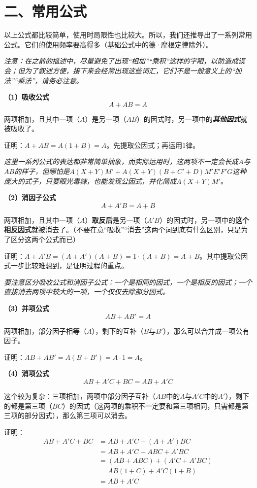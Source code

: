 \documentclass[UTF8]{ctexart}
\begin{document}
\section*{二、常用公式}

以上公式都比较简单，使用时局限性也比较大。所以，我们还推导出了一系列常用公式。它们的使用频率要高得多（基础公式中的德·摩根定律除外）。

\textit{注意：在之前的描述中，尽量避免了出现“相加”“乘积”这样的字眼，以防造成误会；但为了叙述方便，接下来会经常出现这些词汇，它们不是一般意义上的“加法”“乘法”，请务必注意。}

\textbf{（1）吸收公式}
\[A+AB=A\]

两项相加，且其中一项（$A$）是另一项（$AB$）的因式时，另一项中的\textbf{\textit{其他因式}}就被吸收了。

证明：$A+AB=A(1+B)=A$。先提取公因式；再运用1律。

\textit{这里一系列公式的表达都非常简单抽象，而实际运用时，这两项不一定会长成$A$与$AB$的样子，但哪怕是$A(X+Y)M'+A(X+Y)(B+C'+D)M'E'F'G$这种庞大的式子，只要眼光毒辣，也能发现公因式，并化简成$A(X+Y)M'$。}

\textbf{（2）消因子公式}
\[A+A'B=A+B\]

两项相加，且其中一项（$A$）\textbf{取反后}是另一项（$A'B$）的因式时，另一项中的\textbf{这个相反因式}就被消去了。（不要在意“吸收”“消去”这两个词到底有什么区别，只是为了区分这两个公式而已）

证明：$A+A'B=(A+A')(A+B)=1\cdot (A+B)=A+B$。其中提取公因式一步比较难想到，是证明过程的重点。

\textit{要注意区分吸收公式和消因子公式：一个是相同的因式，一个是相反的因式；一个直接消去两项中较大的一项，一个仅仅去除部分因式。}

\textbf{（3）并项公式}
\[AB+AB'=A\]

两项相加，部分因子相等（$A$），剩下的互补（$B$与$B'$），那么可以合并成一项公有因子。

证明：$AB+AB'=A(B+B')=A\cdot 1=A$。

\textbf{（4）消项公式}
\[AB+A'C+BC=AB+A'C\]

这个较为复杂：三项相加，两项中部分因子互补（$AB$中的$A$与$A'C$中的$A'$），剩下的都是第三项（$BC$）的因式（这两项的乘积不一定要和第三项相同，只需都是第三项的部分因式），那么第三项可以消去。

证明：
\begin{equation*}\begin{aligned}
AB+A'C+BC&=AB+A'C+(A+A')BC\\ 
&=AB+A'C+ABC+A'BC\\ 
&=(AB+ABC)+(A'C+A'BC)\\ 
&=AB(1+C)+A'C(1+B)\\ 
&=AB+A'C
\end{aligned}\end{equation*}
\end{document}
